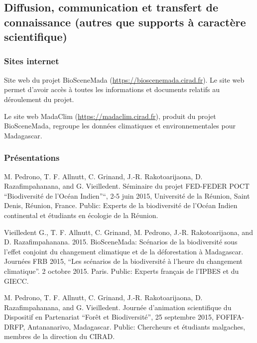 \documentclass[12pt,]{article}
\begin{document}
\hypertarget{diffusion-communication-et-transfert-de-connaissance-autres-que-supports-a-caractere-scientifique}{%
\subsection{Diffusion, communication et transfert de connaissance
(autres que supports à caractère
scientifique)}\label{diffusion-communication-et-transfert-de-connaissance-autres-que-supports-a-caractere-scientifique}}

\hypertarget{sites-internet}{%
\subsubsection{Sites internet}\label{sites-internet}}

Site web du projet BioSceneMada (\url{https://bioscenemada.cirad.fr}).
Le site web permet d'avoir accès à toutes les informations et documents
relatifs au déroulement du projet.

Le site web MadaClim (\url{https://madaclim.cirad.fr}), produit du
projet BioSceneMada, regroupe les données climatiques et
environnementales pour Madagascar.

\hypertarget{presentations}{%
\subsubsection{Présentations}\label{presentations}}

M. Pedrono, T. F. Allnutt, C. Grinand, J.-R. Rakotoarijaona, D.
Razafimpahanana, and G. Vieilledent. Séminaire du projet FED-FEDER POCT
``Biodiversité de l'Océan Indien''``, 2-5 juin 2015, Université de la
Réunion, Saint Denis, Réunion, France. Public: Experts de la
biodiversité de l'Océan Indien continental et étudiants en écologie de
la Réunion.

Vieilledent G., T. F. Allnutt, C. Grinand, M. Pedrono, J.-R.
Rakotoarijaona, and D. Razafimpahanana. 2015. BioSceneMada: Scénarios de
la biodiversité sous l'effet conjoint du changement climatique et de la
déforestation à Madagascar. Journées FRB 2015, ``Les scénarios de la
biodiversité à l'heure du changement climatique''. 2 octobre 2015.
Paris. Public: Experts français de l'IPBES et du GIECC.

M. Pedrono, T. F. Allnutt, C. Grinand, J.-R. Rakotoarijaona, D.
Razafimpahanana, and G. Vieilledent. Journée d'animation scientifique du
Dispositif en Partenariat ``Forêt et Biodiversité'', 25 septembre 2015,
FOFIFA-DRFP, Antananarivo, Madagascar. Public: Chercheurs et étudiants
malgaches, membres de la direction du CIRAD.
\end{document}
